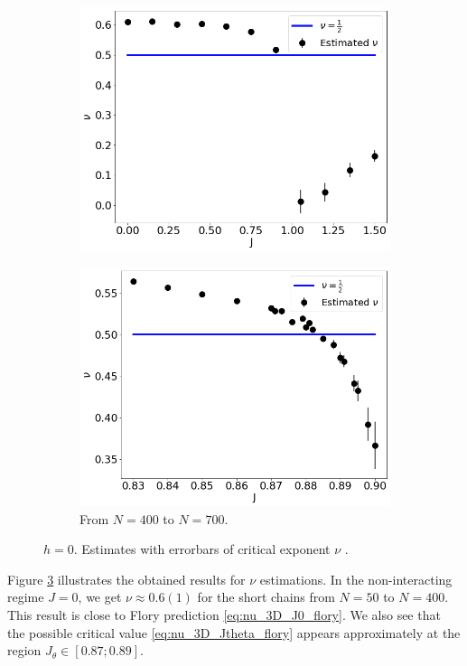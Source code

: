  \begin{figure}
	\centering
	\captionsetup{justification=centering}
	\begin{subfigure}[b]{0.45\textwidth}
		\includegraphics[scale=0.36]{Images/3_nu_shortchains.png}
		\label{fig:nushort3D_short}
	\end{subfigure}
	\begin{subfigure}[b]{0.45\textwidth}
		\includegraphics[scale=0.36]{Images/3_nu_shortchains_deep.png}
		\caption{ From $N=400$ to $N=700$. }
		\label{fig:nushort3D_long}
	\end{subfigure}
	\caption{$h=0$. Estimates with errorbars of critical exponent $\nu$ .   }
	\label{fig:nushort3D}
\end{figure}
Figure \ref{fig:nushort3D} illustrates the obtained results for $\nu$ estimations. In the non-interacting regime $J=0$, we get $\nu \approx 0.6(1) $ for the short chains from $N=50$ to $N=400$. This result is close to Flory prediction \eqref{eq:nu_3D_J0_flory}. We also see that the possible critical value \eqref{eq:nu_3D_Jtheta_flory} appears approximately at the region $J_{\theta} \in [0.87; 0.89]$.  


